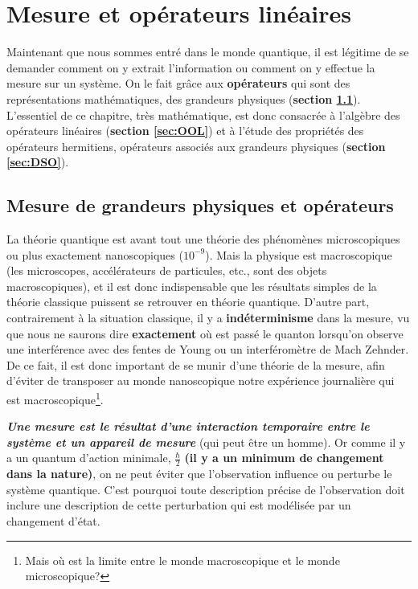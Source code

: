 \chapter{Mesure et opérateurs linéaires}
\label{sec:OpLin}
\minitoc

\bigskip


Maintenant que nous sommes entré dans le monde quantique, il est légitime de se
demander comment on y extrait l'information ou comment on y effectue la mesure
sur un système. On le fait  grâce aux \textbf{opérateurs}  qui sont des
représentations mathématiques, des grandeurs physiques (\textbf{section
\ref{sec:MesGrPh}}). L'essentiel de ce chapitre, très mathématique, est donc
consacrée à l'algèbre des opérateurs linéaires (\textbf{section \ref{sec:OOL}})
et à l'étude des propriétés des opérateurs hermitiens, opérateurs associés aux
grandeurs physiques (\textbf{section \ref{sec:DSO}}).

\section{Mesure de grandeurs physiques et opérateurs}
\label{sec:MesGrPh}

La théorie quantique est avant tout une théorie des phénomènes microscopiques ou
plus exactement nanoscopiques ($10^{-9}$). Mais la physique est macroscopique
(les microscopes, accélérateurs de particules, etc., sont des objets
macroscopiques), et il est donc indispensable que les résultats simples de la
théorie classique puissent se retrouver en théorie quantique. D'autre part,
contrairement à la situation classique, il y a \textbf{indéterminisme} dans la
mesure, vu que nous ne saurons dire \textbf{exactement} où est passé le quanton
lorsqu'on observe une interférence avec des fentes de Young ou un interféromètre
de Mach Zehnder. De ce fait, il est donc important de se munir d'une théorie de
la mesure, afin d'éviter de transposer au monde nanoscopique notre expérience
journalière qui est macroscopique\footnote{Mais où est la limite entre le monde
macroscopique et le monde microscopique?}.

\colorbox[gray]{0.8}{
\parbox[c]{0.9\textwidth}{
\begin{definition}
\emph{\textbf{Une mesure est le résultat d'une interaction temporaire entre le
système et un appareil de mesure} }(qui peut être un homme). Or comme il y a
un quantum d'action minimale, $\frac{\hbar}{2}$ \textbf{(il y a un minimum de
changement dans la nature)}, on ne peut éviter que l'observation influence ou
perturbe le système quantique. C'est pourquoi toute description précise de
l'observation doit inclure une description de cette perturbation qui est
modélisée par un changement d'état.
\end{definition}
}}\medskip

